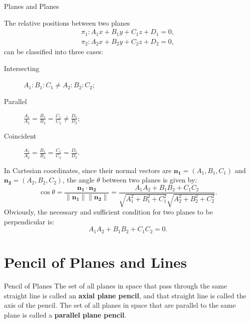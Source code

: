 \documentclass[11pt]{../../TexTemplate/elegantbook} %
\begin{document}
\begin{leftbarTitle}{Planes and Planes}\end{leftbarTitle}
The relative positions between two planes
\begin{gather*}
    \pi_{1}: A_{1} x + B_{1} y + C_{1} z + D_{1} = 0, \\
    \pi_{2}: A_{2} x + B_{2} y + C_{2} z + D_{2} = 0,
\end{gather*}
can be classified into three cases:
\begin{description}
    \item[Intersecting] \(A_{1} : B_{1} : C_{1} \neq A_{2} : B_{2} : C_{2}\);
    \item[Parallel] \(\frac{A_{1}}{A_{2}}=\frac{B_{1}}{B_{2}}=\frac{C_{1}}{C_{2}}\neq \frac{D_{1}}{D_{2}}\);
    \item[Coincident] \(\frac{A_{1}}{A_{2}}=\frac{B_{1}}{B_{2}}=\frac{C_{1}}{C_{2}}=\frac{D_{1}}{D_{2}}\).
\end{description}
In Cartesian coordinates, since their normal vectors are 
\(\mathbf{n_{1}} = (A_{1}, B_{1}, C_{1})\) and \(\mathbf{n_{2}} = (A_{2}, B_{2}, C_{2})\), 
the angle \(\theta\) between two planes is given by:
\[
\cos \theta = \frac{\mathbf{n_{1}} \cdot \mathbf{n_{2}}}{\|\mathbf{n_{1}}\| \|\mathbf{n_{2}}\|} = \frac{A_{1}A_{2} + B_{1}B_{2} + C_{1}C_{2}}{\sqrt{A_{1}^{2} + B_{1}^{2} + C_{1}^{2}} \sqrt{A_{2}^{2} + B_{2}^{2} + C_{2}^{2}}}.
\]
Obviously, the necessary and sufficient condition for two planes to be perpendicular is: 
\[
A_{1}A_{2} + B_{1}B_{2} + C_{1}C_{2} = 0.
\]


\section{Pencil of Planes and Lines}
\begin{definition}{Pencil of Planes}
    The set of all planes in space that pass through the same straight line is called an \textbf{axial plane pencil}, 
    and that straight line is called the axis of the pencil. 
    The set of all planes in space that are parallel to the same plane is called a \textbf{parallel plane pencil}.
\end{definition}
\end{document}
